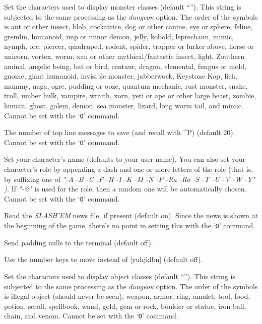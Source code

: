 \item[\ib{monsters}]
Set the characters used to display monster classes (default
``\Symbol{abcdefghijklmnopqrstuvwxyzABCDEFGHIJKLMNOPQRSTUVWXYZ@\ \'{}\&;:\~{}]}'').
This string is subjected to the same processing as the
{\it dungeon\/} 
option.
The order of the symbols is
ant or other insect, blob, cockatrice,
dog or other canine, eye or sphere, feline,
gremlin, humanoid, imp or minor demon,
jelly, kobold, leprechaun,
mimic, nymph, orc,
piercer, quadruped, rodent,
spider, trapper or lurker above, horse or unicorn,
vortex, worm, xan or other mythical/fantastic insect,
light, Zouthern aminal,
angelic being, bat or bird, centaur,
dragon, elemental, fungus or mold,
gnome, giant humanoid, invisible monster,
jabberwock, Keystone Kop, lich,
mummy, naga, ogre,
pudding or ooze, quantum mechanic, rust monster,
snake, troll, umber hulk,
vampire, wraith, xorn,
yeti or ape or other large beast, zombie,
human, ghost, golem,
demon, sea monster, lizard,
long worm tail, and mimic.
Cannot be set with the `{\tt O}' command.

\item[\ib{msghistory}]
The number of top line messages to save (and recall with \^{}P) (default 20).
Cannot be set with the `{\tt O}' command.

\item[\ib{name}]
Set your character's name (defaults to your user name).  You can also
set your character's role by appending a dash and one or more letters of
the role (that is, by suffixing one of
{\it "-A -B -C -F -H -I -K -M -N -P -Ra -Ro -S -T -U -V -W -Y" ).\/} 
If
{\it "-@"\/} 
is used for the role, then a random one will be automatically chosen.
Cannot be set with the `{\tt O}' command.

\item[\ib{news}]
Read the {\it SLASH'EM\/} news file, if present (default on).
Since the news is shown at the beginning of the game, there's no point
in setting this with the `{\tt O}' command.

\item[\ib{null}]
Send padding nulls to the terminal (default off).

\item[\ib{number\_pad}]
Use the number keys to move instead of [yuhjklbn] (default off).

\item[\ib{objects}]
Set the characters used to display object classes
(default ``\Symbol{])[="(\%!?+/\$*`0\_.}'').
This string is subjected to the same processing as the
{\it dungeon\/} 
option.
The order of the symbols is
illegal-object (should never be seen), weapon, armor, ring, amulet, tool,
food, potion, scroll, spellbook, wand, gold, gem or rock, boulder or statue,
iron ball, chain, and venom.
Cannot be set with the `{\tt O}' command.

